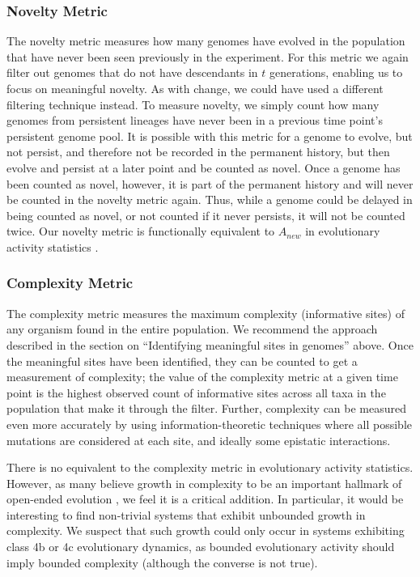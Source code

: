 \documentclass[letterpaper]{article}
\begin{document}
\subsubsection{Novelty Metric}
The novelty metric measures how many genomes have evolved in the population that have never been seen previously in the experiment. For this metric we again filter out genomes that do not have descendants in $t$ generations, enabling us to focus on meaningful novelty. As with change, we could have used a different filtering technique instead. To measure novelty, we simply count how many genomes from persistent lineages have never been in a previous time point’s persistent genome pool. It is possible with this metric for a genome to evolve, but not persist, and therefore not be recorded in the permanent history, but then evolve and persist at a later point and be counted as novel. Once a genome has been counted as novel, however, it is part of the permanent history and will never be counted in the novelty metric again. Thus, while a genome could be delayed in being counted as novel, or not counted if it never persists, it will not be counted twice. Our novelty metric is functionally equivalent to $A_{new}$ in evolutionary activity statistics \citep{bedau_comparison_1997}.    

\subsubsection{Complexity Metric}
The complexity metric measures the maximum complexity (informative sites) of any organism found in the entire population. We recommend the approach described in the section on  ``Identifying meaningful sites in genomes'' above. Once the meaningful sites have been identified, they can be counted to get a measurement of complexity; the value of the complexity metric at a given time point is the highest observed count of informative sites across all taxa in the population that make it through the filter. Further, complexity can be measured even more accurately by using information-theoretic techniques where all possible mutations are considered at each site, and ideally some epistatic interactions.

There is no equivalent to the complexity metric in evolutionary activity statistics. However, as many believe growth in complexity to be an important hallmark of open-ended evolution \citep{taylor_open-ended_2016}, we feel it is a critical addition. In particular, it would be interesting to find non-trivial systems that exhibit unbounded growth in complexity. We suspect that such growth could only occur in systems exhibiting class 4b or 4c evolutionary dynamics, as bounded evolutionary activity should imply bounded complexity (although the converse is not true).
\end{document}
